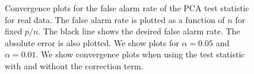 \begin{figure}
\begin{center}
  \caption{Convergence plots for the false alarm rate of the PCA test statistic for
    real data. The false alarm rate is plotted as a function of $n$ for fixed
    $p/n$. The black line shows the desired false alarm rate. The absolute error is also
    plotted. We show plots for $\alpha=0.05$ and $\alpha=0.01$. We show convergence plots
    when using the test statistic with and without the correction term.}
  \label{fig:pca_conv_real}
\end{center}
\end{figure}

